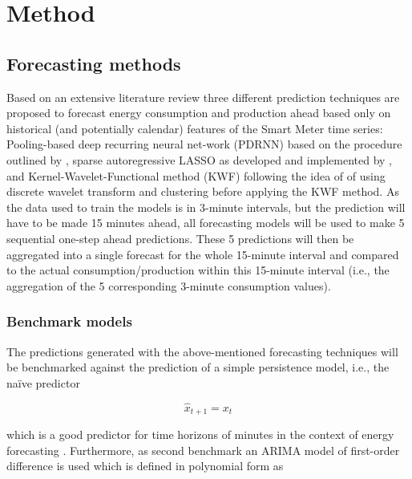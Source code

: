 
\section{Method}\label{Sec:Method}




\subsection{Forecasting methods}\label{Sec:Method;Subsec:Forecast}

Based on an extensive literature review three different prediction techniques are proposed to forecast energy consumption and production ahead based only on historical (and potentially calendar) features of the Smart Meter time series: Pooling-based deep recurring neural net-work (PDRNN) based on the procedure outlined by \citet{Shi:2017}, sparse autoregressive LASSO as developed and implemented by \citet{Li:2017}, and Kernel-Wavelet-Functional method (KWF) following the idea of \citet{Auder:2018} of using discrete wavelet transform and clustering before applying the KWF method.
As the data used to train the models is in 3-minute intervals, but the prediction will have to be made 15 minutes ahead, all forecasting models will be used to make 5 sequential one-step ahead predictions. These 5 predictions will then be aggregated into a single forecast for the whole 15-minute interval and compared to the actual consumption/production within this 15-minute interval (i.e., the aggregation of the 5 corresponding 3-minute consumption values).


\subsubsection{Benchmark models}

The predictions generated with the above-mentioned forecasting techniques will be benchmarked against the prediction of a simple persistence model, i.e., the naïve predictor

\begin{equation} \label{Eq:naivepred}
\widehat{x}_{t+1}=x_t
\end{equation}

which is a good predictor for time horizons of minutes in the context of energy forecasting \citep{Pinson:2012}. Furthermore, as second benchmark an ARIMA model of first-order difference is used which is defined in polynomial form as

